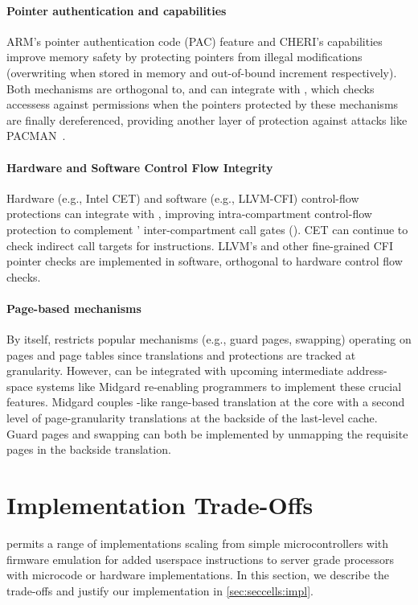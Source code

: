 \paragraph{Pointer authentication and capabilities}
ARM's pointer authentication code (PAC) feature and CHERI's capabilities
improve memory safety by protecting pointers from illegal 
modifications (overwriting when stored in memory and out-of-bound
increment respectively). Both mechanisms are orthogonal to,
and can integrate with \seccells, which checks accessess against \ptable
permissions when the 
pointers protected by these mechanisms are finally dereferenced, providing
another layer of protection against attacks like PACMAN~\cite{pacmanRavichandranNLY22}.

\paragraph{Hardware and Software Control Flow Integrity}
Hardware (e.g., Intel CET) and software (e.g., LLVM-CFI) control-flow
protections can integrate with \seccells, 
improving intra-compartment control-flow protection to
complement \seccells' inter-compartment call gates (\sdentry).
CET can continue to check indirect call targets for  instructions. 
LLVM's and other fine-grained CFI pointer checks are implemented in software, 
orthogonal to hardware control flow checks.


\paragraph{Page-based mechanisms}
By itself, \seccells restricts popular mechanisms (e.g., guard pages, swapping)
operating on pages and page tables since translations and protections are 
tracked at \cell granularity.
However, \seccells can be integrated with upcoming intermediate address-space 
systems like Midgard re-enabling programmers to implement these crucial 
features.
Midgard couples \seccells-like range-based translation at the core with
a second level of page-granularity translations at the backside of the 
last-level cache.
Guard pages and swapping can both be implemented by unmapping the requisite pages 
in the backside translation.


\section{\seccells Implementation Trade-Offs}
\label{app:impl_options}

\seccells permits a range of implementations scaling from simple 
microcontrollers with firmware emulation for added userspace
instructions to server grade processors with microcode or hardware 
implementations. In this section, we describe the trade-offs and 
justify our implementation in \autoref{sec:seccells:impl}.

